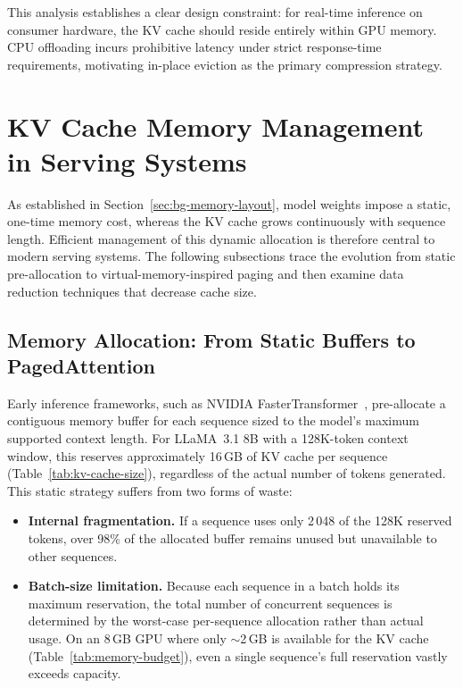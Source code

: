 \documentclass[
english,                 %
bibtex,                  %
]{kththesis}
\numberwithin{listing}{chapter}
\begin{document}
This analysis establishes a clear design constraint: for real-time inference on consumer hardware, the \gls{KV} cache should reside entirely within \gls{GPU} memory. \gls{CPU} offloading incurs prohibitive latency under strict response-time requirements, motivating in-place eviction as the primary compression strategy.
\section{KV Cache Memory Management in Serving Systems}
\label{sec:bg-cache-management}

As established in Section~\ref{sec:bg-memory-layout}, model weights impose a static, one-time memory cost, whereas the \gls{KV} cache grows continuously with sequence length. Efficient management of this dynamic allocation is therefore central to modern serving systems. The following subsections trace the evolution from static pre-allocation to virtual-memory-inspired paging and then examine data reduction techniques that decrease cache size.

\subsection{Memory Allocation: From Static Buffers to PagedAttention}
\label{sec:bg-allocation}

Early inference frameworks, such as NVIDIA FasterTransformer~\cite{nvidia2023fastertransformer}, pre-allocate a contiguous memory buffer for each sequence sized to the model's maximum supported context length. For LLaMA~3.1 8B with a 128K-token context window, this reserves approximately 16\,GB of \gls{KV} cache per sequence (Table~\ref{tab:kv-cache-size}), regardless of the actual number of tokens generated. This static strategy suffers from two forms of waste:

\begin{itemize}
  \item \textbf{Internal fragmentation.} If a sequence uses only 2\,048 of the 128K reserved tokens, over 98\% of the allocated buffer remains unused but unavailable to other sequences.
  \item \textbf{Batch-size limitation.} Because each sequence in a batch holds its maximum reservation, the total number of concurrent sequences is determined by the worst-case per-sequence allocation rather than actual usage. On an 8\,GB \gls{GPU} where only $\sim$2\,GB is available for the \gls{KV} cache (Table~\ref{tab:memory-budget}), even a single sequence's full reservation vastly exceeds capacity.
\end{itemize}
\end{document}
